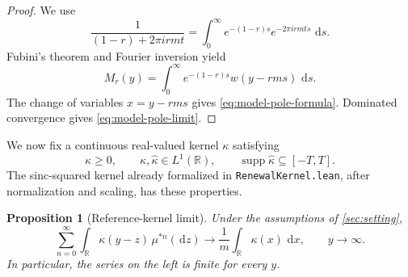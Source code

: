 \documentclass[10pt,reqno,a4paper]{amsart}
\numberwithin{equation}{section}
\theoremstyle{plain}
\newtheorem{proposition}[theorem]{Proposition}
\theoremstyle{definition}
\theoremstyle{remark}
\newcommand{\R}{\mathbb{R}}
\newcommand{\1}{\mathbf{1}}
\newcommand{\de}{\,\mathrm{d}}
\newcommand{\supp}{\operatorname{supp}}
\begin{document}
\begin{proof}
  We use
  \begin{equation*}
    \frac{1}{(1-r)+2\pi i rmt}
    =
    \int_0^\infty
    e^{-(1-r)s}e^{-2\pi i rmts}\,\de s.
  \end{equation*}
  Fubini's theorem and Fourier inversion yield
  \begin{equation*}
    M_r(y)
    =
    \int_0^\infty e^{-(1-r)s}w(y-rms)\,\de s.
  \end{equation*}
  The change of variables \(x=y-rms\) gives
  \cref{eq:model-pole-formula}.  Dominated convergence gives
  \cref{eq:model-pole-limit}.
\end{proof}

We now fix a continuous real-valued kernel \(\kappa\) satisfying
\begin{equation}\label{eq:reference-kernel}
  \kappa\geq0,\qquad
  \kappa,\widehat\kappa\in L^1(\R),\qquad
  \supp\widehat\kappa\subseteq[-T,T].
\end{equation}
The sinc-squared kernel already formalized in
\texttt{RenewalKernel.lean}, after normalization and scaling, has these
properties.

\begin{proposition}[Reference-kernel limit]\label{prop:reference-kernel}
  Under the assumptions of \cref{sec:setting},
  \begin{equation}\label{eq:reference-kernel-limit}
    \sum_{n=0}^{\infty}
    \int_\R\kappa(y-z)\,\mu^{*n}(\de z)
    \longrightarrow
    \frac{1}{m}\int_\R\kappa(x)\,\de x,
    \qquad y\to\infty.
  \end{equation}
  In particular, the series on the left is finite for every \(y\).
\end{proposition}
\end{document}
